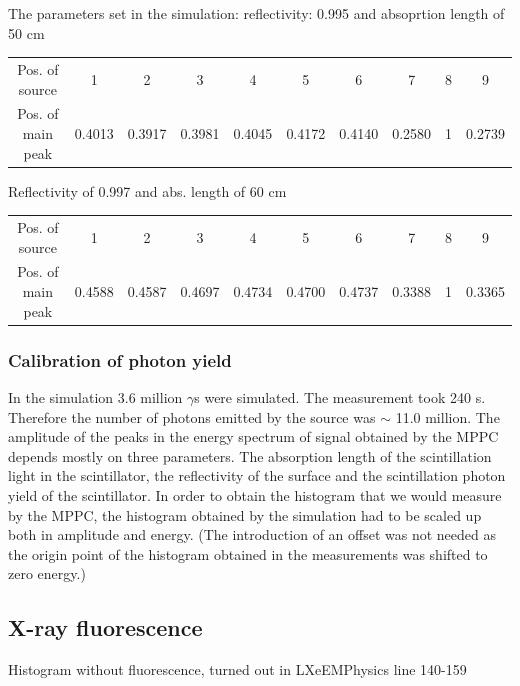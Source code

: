 \documentclass[12pt, a4paper,titlepage]{article}
\numberwithin{equation}{section}
\numberwithin{figure}{section}
\begin{document}
The parameters set in the simulation: reflectivity: 0.995 and absoprtion length of 50 cm

\begin{center}
\begin{tabular}{ |c|c|c|c|c|c|c|c|c|c| } 
 \hline
 Pos. of source & 1 & 2 & 3 & 4 & 5 & 6 & 7 & 8 & 9 \\ 
 Pos. of main peak & 0.4013 & 0.3917 & 0.3981 & 0.4045 & 0.4172 & 0.4140 & 0.2580 & 1 & 0.2739\\ 
 \hline
\end{tabular}
\end{center}

Reflectivity of 0.997 and abs. length of 60 cm

\begin{center}
\begin{tabular}{ |c|c|c|c|c|c|c|c|c|c| } 
 \hline
  Pos. of source & 1 & 2 & 3 & 4 & 5 & 6 & 7 & 8 & 9 \\ 
  Pos. of main peak & 0.4588 & 0.4587 & 0.4697 & 0.4734 & 0.4700 & 0.4737 & 0.3388 & 1 & 0.3365  \\ 
 \hline
\end{tabular}
\end{center}

\pagebreak

\subsubsection{Calibration of photon yield}

In the simulation 3.6 million $\gamma$s were simulated. The measurement took 240 s. Therefore the number of photons emitted by the source was $\sim$ 11.0 million. The amplitude of the peaks in the energy spectrum of signal obtained by the MPPC depends mostly on three parameters. The absorption length of the scintillation light in the scintillator, the reflectivity of the surface and the scintillation photon yield of the scintillator. In order to obtain the histogram that we would measure by the MPPC, the histogram obtained by the simulation had to be scaled up both in amplitude and energy. (The introduction of an offset was not needed as the origin point of the histogram obtained in the measurements was shifted to zero energy.)

 


\subsection{X-ray fluorescence}
Histogram without fluorescence, turned out in LXeEMPhysics line 140-159
\end{document}
